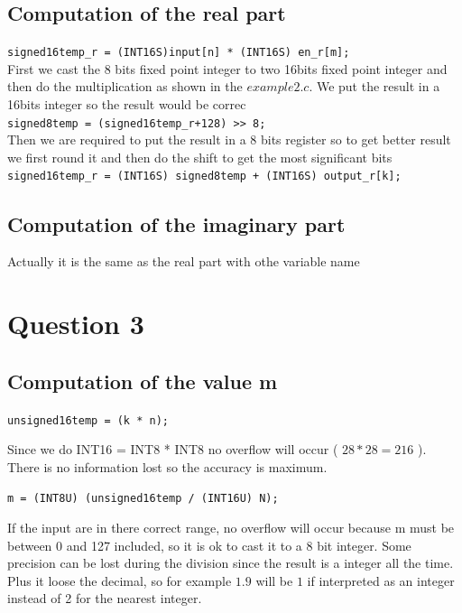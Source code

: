 \documentclass[a4paper]{article}
\begin{document}
\subsection{Computation of the real part}

\verb|signed16temp_r = (INT16S)input[n] * (INT16S) en_r[m];|
\\
First we cast the 8 bits fixed point integer to two 16bits fixed point integer and then do the multiplication as shown in the $example2.c$. We put the result in a 16bits integer so the result would be correc\\
\verb|signed8temp = (signed16temp_r+128) >> 8;|
\\
Then we are required to put the result in a 8 bits register so to get better result we first round it  and then do the shift to get the most significant bits
\\
\verb|signed16temp_r = (INT16S) signed8temp + (INT16S) output_r[k];|
\\

\subsection{Computation of the imaginary part}

Actually it is the same as the real part with othe variable name


\section{Question 3}

\subsection{Computation of the value m}

\verb|unsigned16temp = (k * n);|

Since we do INT16 = INT8 * INT8 no overflow will occur ( $2{8}*2{8} = 2{16}$ ). There is no information lost so the accuracy is maximum.

\verb|m = (INT8U) (unsigned16temp / (INT16U) N);|

If the input are in there correct range, no overflow will occur because m must be between 0 and 127 included, so it is ok to cast it to a 8 bit integer. Some precision can be lost during the division since the result is a integer all the time. Plus it loose the decimal, so for example $1.9$ will be $1$ if interpreted as an integer instead of 2 for the nearest integer.
\end{document}
